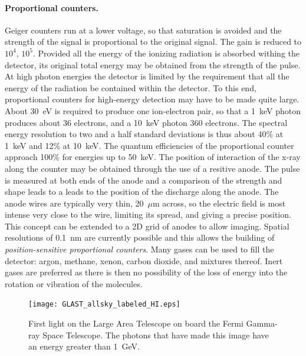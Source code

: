 \paragraph{Proportional counters.} Geiger counters run at a lower voltage, so that 
saturation is avoided and the strength of the signal is proportional to the
original signal. The gain is reduced to $10^4$, $10^5$. Provided all the
energy of the ionizing radiation is absorbed withing the detector, its
original total energy may be obtained from the strength of the pulse. 
At high photon energies the detector is limited by the requirement that 
all the energy of the radiation be contained within the detector. To this
end, proportional counters for high-energy detection may have to be made quite
large. About 30~eV is required to produce one ion-electron pair, so that a
1~keV photon produces about 36 electrons, and a 10~keV photon 360 electrons. 
The spectral energy resolution to two and a half standard deviations is 
thus about 40\% at 1~keV and 12\% at 10~keV. The quantum efficiencies 
of the proportional counter approach 100\% for energies up to
50~keV. The position of interaction of the x-ray along the counter may
be obtained through the use of a resitive anode. The pulse is measured
at both ends of the anode and a comparison of the strength and shape
leads to a leads to the position of the discharge along the anode. The
anode wires are typically very thin, 20~$\mu$m across, so the electric
field is most intense very close to the wire, limiting its spread, and
giving a precise position. This concept can be extended to a 2D grid
of anodes to allow imaging. Spatial resolutions of 0.1~nm are
currently possible and this allows the building of {\it
  position-sensitive proportional counters}. Many
gases can be used to fill the detector: argon, methane, xenon, carbon dioxide,
and mixtures thereof. Inert gases are preferred as there is then no possibility
of the loss of energy into the rotation or vibration of the molecules. 

\begin{figure}[h]
  \centering
	\texttt{[image: GLAST\_allsky\_labeled\_HI.eps]}
  \caption{First light on the Large Area Telescope on board the Fermi Gamma-ray
Space Telescope. The photons that have made this image have an energy
greater than 1~GeV.}
  \label{fig:glast_allsky}
\end{figure}

